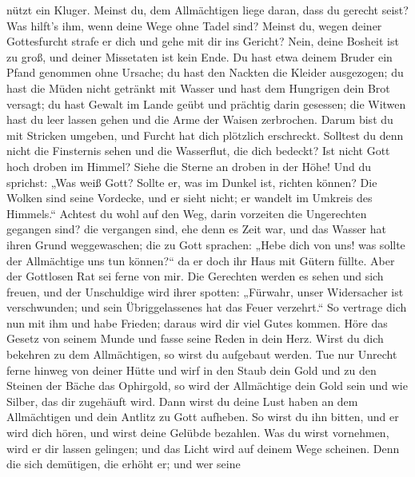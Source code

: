 nützt ein Kluger.  Meinst du, dem Allmächtigen liege daran,
dass du gerecht seist? Was hilft's ihm, wenn deine Wege ohne Tadel sind?
 Meinst du, wegen deiner Gottesfurcht strafe er dich und
gehe mit dir ins Gericht?  Nein, deine Bosheit ist zu groß,
und deiner Missetaten ist kein Ende.  Du hast etwa deinem
Bruder ein Pfand genommen ohne Ursache; du hast den Nackten die Kleider
ausgezogen;  du hast die Müden nicht getränkt mit Wasser und
hast dem Hungrigen dein Brot versagt;  du hast Gewalt im
Lande geübt und prächtig darin gesessen;  die Witwen hast du
leer lassen gehen und die Arme der Waisen zerbrochen. 
Darum bist du mit Stricken umgeben, und Furcht hat dich plötzlich
erschreckt.  Solltest du denn nicht die Finsternis sehen
und die Wasserflut, die dich bedeckt?  Ist nicht Gott hoch
droben im Himmel? Siehe die Sterne an droben in der Höhe! 
Und du sprichst: „Was weiß Gott? Sollte er, was im Dunkel ist, richten
können?  Die Wolken sind seine Vordecke, und er sieht
nicht; er wandelt im Umkreis des Himmels.``  Achtest du
wohl auf den Weg, darin vorzeiten die Ungerechten gegangen sind?
 die vergangen sind, ehe denn es Zeit war, und das Wasser
hat ihren Grund weggewaschen;  die zu Gott sprachen: „Hebe
dich von uns! was sollte der Allmächtige uns tun können?{}``
 da er doch ihr Haus mit Gütern füllte. Aber der Gottlosen
Rat sei ferne von mir.  Die Gerechten werden es sehen und
sich freuen, und der Unschuldige wird ihrer spotten: 
„Fürwahr, unser Widersacher ist verschwunden; und sein Übriggelassenes
hat das Feuer verzehrt.``  So vertrage dich nun mit ihm und
habe Frieden; daraus wird dir viel Gutes kommen.  Höre das
Gesetz von seinem Munde und fasse seine Reden in dein Herz.
 Wirst du dich bekehren zu dem Allmächtigen, so wirst du
aufgebaut werden. Tue nur Unrecht ferne hinweg von deiner Hütte
 und wirf in den Staub dein Gold und zu den Steinen der
Bäche das Ophirgold,  so wird der Allmächtige dein Gold
sein und wie Silber, das dir zugehäuft wird.  Dann wirst du
deine Lust haben an dem Allmächtigen und dein Antlitz zu Gott aufheben.
 So wirst du ihn bitten, und er wird dich hören, und wirst
deine Gelübde bezahlen.  Was du wirst vornehmen, wird er
dir lassen gelingen; und das Licht wird auf deinem Wege scheinen.
 Denn die sich demütigen, die erhöht er; und wer seine
